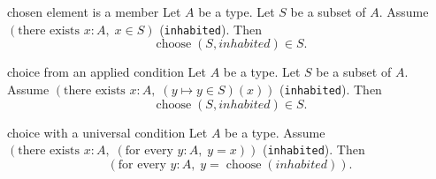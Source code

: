 \begin{cleanresult}{chosen element is a member}
Let $A$ be a type.
Let $S$ be a subset of $A$.
Assume $\left(\text{there exists }x : A,\; x\in S\right)$ (\texttt{inhabited}).
Then \[\operatorname{choose}(S,\mathit{inhabited})\in S.\]
\end{cleanresult}

\begin{cleanresult}{choice from an applied condition}
Let $A$ be a type.
Let $S$ be a subset of $A$.
Assume $\left(\text{there exists }x : A,\; \left(y \mapsto y\in S\right)(x)\right)$ (\texttt{inhabited}).
Then \[\operatorname{choose}(S,\mathit{inhabited})\in S.\]
\end{cleanresult}

\begin{cleanresult}{choice with a universal condition}
Let $A$ be a type.
Assume $\left(\text{there exists }x : A,\; \left(\text{for every }y : A,\; y=x\right)\right)$ (\texttt{inhabited}).
Then \[\left(\text{for every }y : A,\; y=\operatorname{choose}(\mathit{inhabited})\right).\]
\end{cleanresult}


